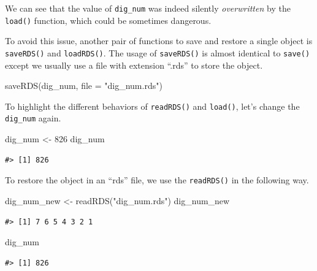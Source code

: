 \documentclass[
]{book}
\newenvironment{Shaded}{\begin{snugshade}}{\end{snugshade}}
\newcommand{\AttributeTok}[1]{\textcolor[rgb]{0.77,0.63,0.00}{#1}}
\newcommand{\DecValTok}[1]{\textcolor[rgb]{0.00,0.00,0.81}{#1}}
\newcommand{\FunctionTok}[1]{\textcolor[rgb]{0.00,0.00,0.00}{#1}}
\newcommand{\NormalTok}[1]{#1}
\newcommand{\OtherTok}[1]{\textcolor[rgb]{0.56,0.35,0.01}{#1}}
\newcommand{\StringTok}[1]{\textcolor[rgb]{0.31,0.60,0.02}{#1}}
\begin{document}
We can see that the value of \texttt{dig\_num} was indeed silently \emph{overwritten} by the \texttt{load()} function, which could be sometimes dangerous.

To avoid this issue, another pair of functions to save and restore a single object is \texttt{saveRDS()} and \texttt{loadRDS()}. The usage of \texttt{saveRDS()} is almost identical to \texttt{save()} except we usually use a file with extension ``.rds'' to store the object.

\begin{Shaded}
\begin{Highlighting}[]
\FunctionTok{saveRDS}\NormalTok{(dig\_num, }\AttributeTok{file =} \StringTok{"dig\_num.rds"}\NormalTok{)}
\end{Highlighting}
\end{Shaded}

To highlight the different behaviors of \texttt{readRDS()} and \texttt{load()}, let's change the \texttt{dig\_num} again.

\begin{Shaded}
\begin{Highlighting}[]
\NormalTok{dig\_num }\OtherTok{\textless{}{-}} \DecValTok{826}
\NormalTok{dig\_num}
\end{Highlighting}
\end{Shaded}

\begin{verbatim}
#> [1] 826
\end{verbatim}

To restore the object in an ``rds'' file, we use the \texttt{readRDS()} in the following way.

\begin{Shaded}
\begin{Highlighting}[]
\NormalTok{dig\_num\_new }\OtherTok{\textless{}{-}} \FunctionTok{readRDS}\NormalTok{(}\StringTok{"dig\_num.rds"}\NormalTok{)}
\NormalTok{dig\_num\_new}
\end{Highlighting}
\end{Shaded}

\begin{verbatim}
#> [1] 7 6 5 4 3 2 1
\end{verbatim}

\begin{Shaded}
\begin{Highlighting}[]
\NormalTok{dig\_num}
\end{Highlighting}
\end{Shaded}

\begin{verbatim}
#> [1] 826
\end{verbatim}
\end{document}
